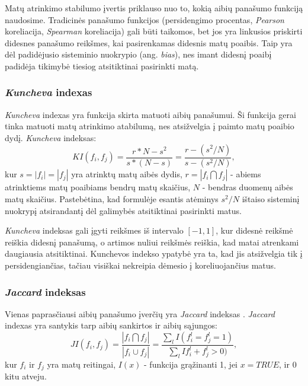 Matų atrinkimo stabilumo įvertis priklauso nuo to, kokią aibių panašumo funkciją naudosime. Tradicinės panašumo funkcijos (persidengimo procentas, \textit{Pearson} koreliacija, \textit{Spearman} koreliacija) gali būti taikomos, bet jos yra linkusios priskirti didesnes panašumo reikšmes, kai pasirenkamas didesnis matų poaibis. Taip yra dėl padidėjusio sisteminio nuokrypio (ang. \textit{bias}), nes imant didesnį poaibį padidėja tikimybė tiesiog atsitiktinai pasirinkti matą.

\subsubsection{\textit{Kuncheva} indexas}

\textit{Kuncheva} indexas \cite{DBLP:conf/aia/Kuncheva07} yra funkcija skirta matuoti aibių panašumui. Ši funkcija gerai tinka matuoti matų atrinkimo atabilumą, nes atsižvelgia į paimto matų poaibio dydį. \textit{Kuncheva} indeksas:
\begin{equation}
\label{kuncheva_index}
 KI(f_i, f_j)=\frac{r*N - s^2}{s*(N-s)}=\frac{r - (s^2/N)}{s - (s^2/N)},
\end{equation}		
kur $s=|f_i|=|f_j|$ yra atrinktų matų aibės dydis, $r=|f_i \bigcap f_j|$ - abiems atrinktiems matų poaibiams bendrų matų skaičius, $N$ - bendras  duomenų aibės matų skaičius. Pastebėtina, kad formulėje esantis atėminys $s^2/N$ ištaiso sisteminį nuokrypį atsirandantį dėl galimybės atsitiktinai pasirinkti matus. 

\textit{Kuncheva} indeksas gali įgyti reikšmes iš intervalo $[-1, 1]$, kur didesnė reikšmė reiškia didesnį panašumą, o artimos nuliui reikšmės reiškia, kad matai atrenkami daugiausia atsitiktinai. Kunchevos indekso ypatybė yra ta, kad jis atsižvelgia tik į persidengiančias, tačiau visiškai nekreipia dėmesio į koreliuojančius matus.

\subsubsection{\textit{Jaccard} indeksas}

Vienas paprasčiausi aibių panašumo įverčių yra \textit{Jaccard} indeksas \cite{jaccard1901etude}. \textit{Jaccard} indexas yra santykis tarp aibių sankirtos ir aibių sąjungos:
\begin{equation}
\label{jaccard_index}
 JI(f_i, f_j)=\frac{|f_i \bigcap f_j|}{|f_i \cup f_j|}=\frac{\sum_{l}I(f_i^l=f_j^l=1)}{\sum_{l}I{f_i^l+f_j^l > 0)}}, 
\end{equation}
kur $f_i$ ir $f_j$ yra matų reitingai, $I(x)$ - funkcija grąžinanti 1, jei $x=TRUE$, ir 0 kitu atveju.

